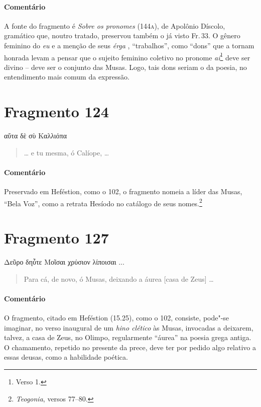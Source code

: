 \medskip

{\paragraph{Comentário} A fonte do fragmento é \textit{Sobre os pronomes} (144\textsc{a}), de Apolônio
Díscolo, gramático que, noutro tratado, preservou também o já visto Fr.\,33. O
gênero feminino do \textit{eu} e a menção de seus \textit{érga }, ``trabalhos'', como
``dons'' que a tornam honrada levam a pensar que o sujeito feminino
coletivo no pronome \textit{aí}\footnote{Verso 1.} deve ser divino -- deve ser o conjunto das Musas. Logo, tais dons
seriam o da poesia, no entendimento mais comum da expressão.}


\section{Fragmento 124}

\begin{gkverse}
αὔτα δὲ σὺ Καλλιόπα
\end{gkverse}

\begin{verse}
\ldots{} e tu mesma, ó Calíope, \ldots{}
\end{verse}

\medskip

{\paragraph{Comentário} Preservado em Heféstion, como o 102, o fragmento nomeia a líder das Musas, ``Bela Voz'', como a retrata Hesíodo no catálogo de seus nomes.\footnote{\textit{Teogonia}, versos 77--80.}}



\pagebreak
\section{Fragmento 127}

\begin{gkverse}
Δεῦρο δηὖτε Μοῖσαι χρύσιον λίποισαι ...
\end{gkverse}

\begin{verse}
Para cá, de novo, ó Musas, deixando a áurea [casa de Zeus] \ldots{}
\end{verse}

\medskip

{\paragraph{Comentário} O fragmento, citado em Heféstion (15.25), como o 102, consiste, pode"-se imaginar, no
verso inaugural de um \textit{hino clético }às Musas, invocadas a deixarem,
talvez, a casa de Zeus, no Olimpo, regularmente ``áurea''
na poesia grega antiga. O chamamento, repetido no presente da prece, deve ter
por pedido algo relativo a essas deusas, como a habilidade poética.}

